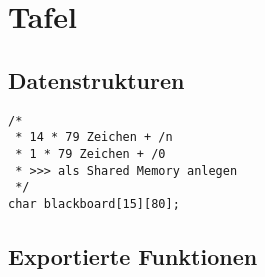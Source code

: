 \section{Tafel}

\subsection{Datenstrukturen}
\begin{lstlisting}
/* 
 * 14 * 79 Zeichen + /n
 * 1 * 79 Zeichen + /0
 * >>> als Shared Memory anlegen
 */
char blackboard[15][80];
\end{lstlisting}

\subsection{Exportierte Funktionen}